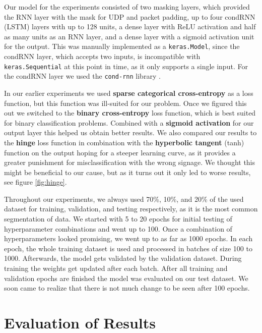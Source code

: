 \documentclass[
	ngerman,
	ruledheaders=section,%
	class=report,%
	thesis={type=bachelor},%
	accentcolor=9c,%
	custommargins=true,%
	marginpar=false,%
	parskip=half-,%
	fontsize=11pt,%
]{tudapub}
\let\code\texttt
\begin{document}
Our model for the experiments consisted of two masking layers, which provided the RNN layer with the mask for UDP and packet padding,
up to four condRNN (LSTM) layers with up to 128 units,
a dense layer with ReLU activation and half as many units as an RNN layer,
and a dense layer with a sigmoid activation unit for the output.
This was manually implemented as a \code{keras.Model}, since the condRNN layer, which accepts two inputs, is incompatible with \code{keras.Sequential} at this point in time, as it only supports a single input.
For the condRNN layer we used the \code{cond-rnn} library \cite{remyPhilipperemyCondRnn2020}.

In our earlier experiments we used \textbf{sparse categorical cross-entropy} as a loss function, but this function was ill-suited for our problem.
Once we figured this out we switched to the \textbf{binary cross-entropy} loss function, which is best suited for binary classification problems.
Combined with a \textbf{sigmoid activation} for our output layer this helped us obtain better results.
We also compared our results to the \textbf{hinge} loss function in combination with the \textbf{hyperbolic tangent} (tanh) function on the output hoping for a steeper learning curve, as it provides a greater punishment for misclassification with the wrong signage.
We thought this might be beneficial to our cause, but as it turns out it only led to worse results, see figure \ref{fig:hinge}.

Throughout our experiments, we always used 70\%, 10\%, and 20\% of the used dataset for training, validation, and testing respectively, as it is the most common segmentation of data.
We started with 5 to 20 epochs for initial testing of hyperparameter combinations and went up to 100.
Once a combination of hyperparameters looked promising, we went up to as far as 1000 epochs.
In each epoch, the whole training dataset is used and processed in batches of size 100 to 1000.
Afterwards, the model gets validated by the validation dataset.
During training the weights get updated after each batch. %
After all training and validation epochs are finished the model was evaluated on our test dataset.
We soon came to realize that there is not much change to be seen after 100 epochs.

\section{Evaluation of Results}
\label{sec:exEval}
\end{document}

